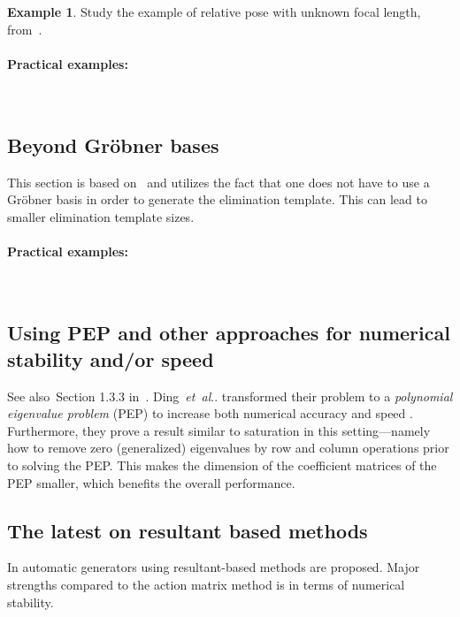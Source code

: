 \documentclass[11pt,a4paper]{article}
\makeatletter
\theoremstyle{definition}
\newtheorem{example}{Example}
\DeclareRobustCommand\etal{\emph{et~al}\@ifnextchar.{}{.\@}}
\newcommand{\pexamples}{\paragraph{Practical examples:}}
\makeatother
\begin{document}
\begin{example}
Study the example of relative pose with unknown focal length,
from~\cite{kukelova-etal-2017-cvpr}.
\end{example}

\pexamples~\cite{kukelova-etal-2017-cvpr,ding-etal-2019-iccv,barath-kukelova-iccv-2019,valtonenoernhag-icpram-2019}

\subsection{Beyond Gröbner bases}
This section is based on~\cite{larsson2018cvpr} and utilizes the fact that one does not
have to use a Gröbner basis in order to generate the elimination template.
This can lead to smaller elimination template sizes.

\pexamples~\cite{valtonenoernhag-springer-2021}

\subsection{Using PEP and other approaches for numerical stability and/or speed}
See also~Section 1.3.3 in~\cite{larsson-phd}.
Ding~\etal{} transformed their problem to a \emph{polynomial eigenvalue problem} (PEP)
to increase both numerical accuracy and speed \cite{ding-etal-tpami-2020,ding-etal-cvpr-2020}.
Furthermore, they prove a result similar to saturation in this setting---namely how to remove
zero (generalized) eigenvalues by row and column operations prior to solving the PEP. This makes the dimension
of the coefficient matrices of the PEP smaller, which benefits the overall performance.

\subsection{The latest on resultant based methods}
In \cite{bhayani-etal-cvpr-2020,bhayani-etal-arxiv-2020} automatic generators using
resultant-based methods are proposed. Major strengths compared to the action matrix method is
in terms of numerical stability.

\clearpage

{\small
}
\end{document}
